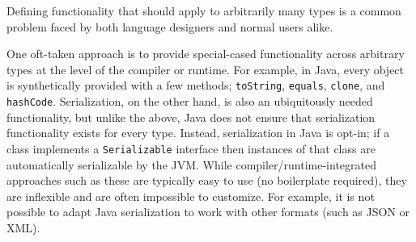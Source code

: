 \documentclass[preprint,nocopyrightspace]{sigplanconf}
\newcommand{\selfassembly}{\texttt{self-assembly~}}
\newcommand{\Selfassembly}{\texttt{Self-assembly~}}
\newcommand{\sselfassembly}{\texttt{self-assembly}}
\begin{document}



Defining functionality that should apply to arbitrarily many types is a common
problem faced by both language designers and normal users alike.

One oft-taken approach is to provide special-cased functionality across
arbitrary types at the level of the compiler or runtime. For example, in Java,
every object is synthetically provided with a few methods;
\lstinline{toString}, \lstinline{equals}, \lstinline{clone}, and
\lstinline{hashCode}. Serialization, on the other hand, is also an
ubiquitously needed functionality, but unlike the above, Java does not ensure
that serialization functionality exists for every type. Instead, serialization
in Java is opt-in; if a class implements a \lstinline{Serializable} interface
then instances of that class are automatically serializable by the JVM. While
compiler/runtime-integrated approaches such as these are typically easy to use
(no boilerplate required), they are inflexible and are often impossible to
customize. For example, it is not possible to adapt Java serialization to work
with other formats (such as JSON or XML).
\end{document}
